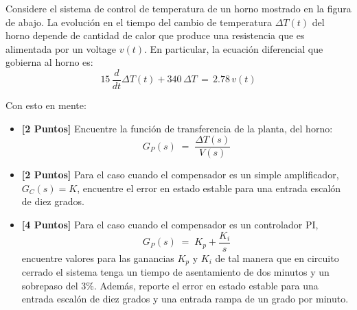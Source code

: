 \documentclass[ a4paper, twoside, 11pt]{article}
\begin{document}
\begin{problem}
Considere el sistema de control de temperatura de un horno mostrado en la figura de abajo. La evoluci\'on en el tiempo del cambio de temperatura $\Delta T(t)$ del horno depende de cantidad de calor que produce una resistencia que es alimentada por un voltage $v(t)$. \linebreak En particular, la ecuaci\'on diferencial que gobierna al horno es: 
\[
15 \, \frac{d}{dt} \Delta T(t) + 340 \, \Delta T \, = \, 2.78 \, v(t)
\]

\begin{figure}[htb]
\centering
\def\svgwidth{0.8\columnwidth}

\end{figure}

Con esto en mente: 
\begin{itemize}
\item \textbf{[2 Puntos]} Encuentre la funci\'on de transferencia de la planta, \ie del horno: 
\[
G_P(s) \; = \; \frac{\Delta T(s)}{V(s)}
\]
\item \textbf{[2 Puntos]} Para el caso cuando el compensador es un simple amplificador, \ie \linebreak $G_C(s) = K$, encuentre el error en estado estable para una entrada escal\'on de diez grados. 
\item \textbf{[4 Puntos]} Para el caso cuando el compensador es un controlador PI, \ie
\[
G_P(s) \; = \; K_p + \frac{K_i}{s}
\]
encuentre valores para las ganancias $K_p$ y $K_i$ de tal manera que en circuito cerrado el sistema tenga un tiempo de asentamiento de dos minutos y un sobrepaso del 3\%. Adem\'as, reporte el error en estado estable para una entrada escal\'on de diez grados y una entrada rampa de un grado por minuto. 
\end{itemize}

\end{problem}
\vspace{\baselineskip}
\end{document}

